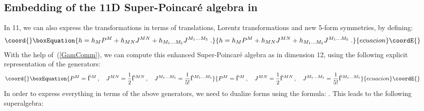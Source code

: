 \documentclass[a4paper,11pt]{article}
\begin{document}
\subsection{Embedding of the 11D Super-Poincar\'e algebra in \coordHE{} }
In 11\coordHE{}, we can also express the \coordHE{} transformations in terms of translations, 
Lorentz transformations and new 5-form symmetries, by defining:
\begin{equation}\coord{}\boxEquation{
h = h_M P^M + h_{MN} J^{MN} + h_{M_1\ldots M_5} J^{M_1\ldots M_5}\;.
}{
h = h_M P^M + h_{MN} J^{MN} + h_{M_1\ldots M_5} J^{M_1\ldots M_5}\;.
}{ecuacion}\coordE{}\end{equation}
With the help of~(\ref{GamComm}), we can compute this enhanced Super-Poincar\'e algebra 
as in dimension 12, using the following explicit representation of the generators:
\begin{equation}\coord{}\boxEquation{
P^M = \tilde{\Gamma}^{M} \,,\quad
J^{MN} =\frac{1}{2} \tilde{\Gamma}^{MN} \,,\quad
J^{M_1\ldots M_5} = \frac{1}{5!}\tilde{\Gamma}^{M_1\ldots M_5}
}{
P^M = \tilde{\Gamma}^{M} \,,\quad
J^{MN} =\frac{1}{2} \tilde{\Gamma}^{MN} \,,\quad
J^{M_1\ldots M_5} = \frac{1}{5!}\tilde{\Gamma}^{M_1\ldots M_5}
}{ecuacion}\coordE{}\end{equation}
In order to express everything in terms of the above generators, we need to dualize forms using the formula:
\coordHE{}.
This leads to the following superalgebra:
\end{document}
